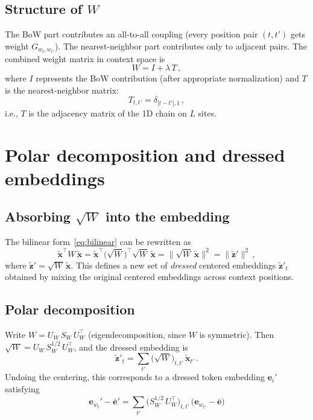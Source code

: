 \documentclass[11pt]{article}
\newcommand{\ee}{\bm{e}}
\begin{document}
\subsection{Structure of $W$}

The BoW part contributes an all-to-all coupling (every position pair $(t, t')$ gets weight $G_{w_t, w_{t'}}$). The nearest-neighbor part contributes only to adjacent pairs. The combined weight matrix in context space is
\begin{equation}\label{eq:W}
    W = I + \lambda\, T\,,
\end{equation}
where $I$ represents the BoW contribution (after appropriate normalization) and $T$ is the nearest-neighbor matrix:
\begin{equation}\label{eq:T}
    T_{t,t'} = \delta_{|t-t'|, 1}\,,
\end{equation}
i.e., $T$ is the adjacency matrix of the 1D chain on $L$ sites.

\section{Polar decomposition and dressed embeddings}\label{sec:polar}

\subsection{Absorbing $\sqrt{W}$ into the embedding}

The bilinear form~\eqref{eq:bilinear} can be rewritten as
\begin{equation}
    \tilde{\bm{x}}^\top W\, \tilde{\bm{x}} = \tilde{\bm{x}}^\top \big(\sqrt{W}\big)^\top \sqrt{W}\, \tilde{\bm{x}} = \|\sqrt{W}\,\tilde{\bm{x}}\|^2 = \|\tilde{\bm{z}}'\|^2\,,
\end{equation}
where $\tilde{\bm{z}}' = \sqrt{W}\, \tilde{\bm{x}}$. This defines a new set of \emph{dressed} centered embeddings $\tilde{\bm{z}}'_t$ obtained by mixing the original centered embeddings across context positions.

\subsection{Polar decomposition}

Write $W = U_W\, S_W\, U_W^\top$ (eigendecomposition, since $W$ is symmetric). Then $\sqrt{W} = U_W\, S_W^{1/2}\, U_W^\top$, and the dressed embedding is
\begin{equation}\label{eq:dressed-centered}
    \tilde{\bm{z}}'_t = \sum_{t'} \big(\sqrt{W}\big)_{t,t'}\, \tilde{\bm{x}}_{t'}\,.
\end{equation}
Undoing the centering, this corresponds to a dressed token embedding $\ee_i'$ satisfying
\begin{equation}\label{eq:dressed}
    \boxed{\;\ee_{w_t}' - \bar{\ee}' = \sum_{t'} \big(S_W^{1/2}\, U_W^\top\big)_{t,t'}\, \big(\ee_{w_{t'}} - \bar{\ee}\big)\;}
\end{equation}
\end{document}
